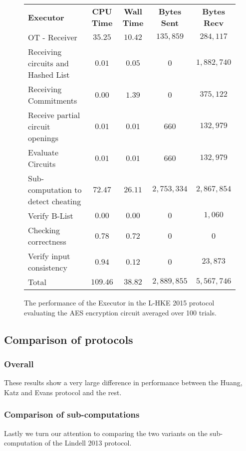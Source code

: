 \documentclass[ %
                    author={Nicholas Tutte},
                supervisor={Prof. Nigel Smart},
                    degree={MEng},
                     title={Secure Two Party Computation},
                  subtitle={A practical comparison of recent protocols},
                      type={Research - GG1K},
                      year={2015} ]{dissertation}
\begin{document}
				\begin{figure}[!ht]
					\begin{tabular}{| p{4.3cm} | c c c c |}
						\hline
						\textbf{Executor} & \textbf{CPU Time} & \textbf{Wall Time} & \textbf{Bytes Sent} & \textbf{Bytes Recv} \\
						\thickhline
						OT - Receiver & $35.25$ & $10.42$ & $135,859$ & $284,117$ \\
						\hline
						Receiving circuits and Hashed List & $0.01$ & $0.05$ & $0$ & $1,882,740$ \\
						\hline
						Receiving Commitments & $0.00$ & $1.39$ & $0$ & $375,122$ \\
						\hline
						Receive partial circuit openings & $0.01$ & $0.01$ & $660$ & $132,979$ \\
						\hline
						Evaluate Circuits & $0.01$ & $0.01$ & $660$ & $132,979$ \\
						\hline
						Sub-computation to detect cheating & $72.47$ & $26.11$ & $2,753,334$ & $2,867,854$ \\
						\hline
						Verify B-List & $0.00$ & $0.00$ & $0$ & $1,060$ \\
						\hline
						Checking correctness & $0.78$ & $0.72$ & $0$ & $0$ \\
						\hline
						Verify input consistency & $0.94$ & $0.12$ & $0$ & $23,873$ \\
						\thickhline
						Total & $109.46$ & $38.82$ & $2,889,855$ & $5,567,746$ \\
						\hline
					\end{tabular}
					\caption{The performance of the Executor in the L-HKE 2015 protocol evaluating the AES encryption circuit averaged over 100 trials. \label{table:L-HKE_2015_AES_Executor}}
				\end{figure}

			\FloatBarrier
			\subsection{Comparison of protocols}
				\subsubsection{Overall}

				These results show a very large difference in performance between the Huang, Katz and Evans protocol and the rest.

				\subsubsection{Comparison of sub-computations}
					Lastly we turn our attention to comparing the two variants on the sub-computation of the Lindell 2013 protocol. 
			
\end{document}
